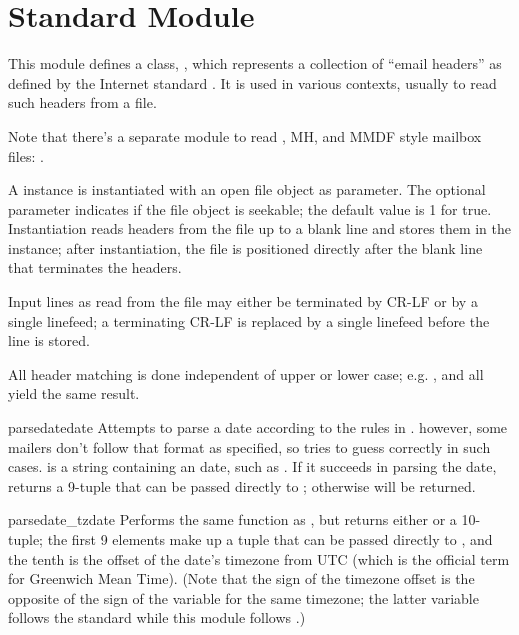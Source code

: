 \section{Standard Module }
\label{module-rfc822}


This module defines a class, , which represents a
collection of ``email headers'' as defined by the Internet standard
.  It is used in various contexts, usually to read such
headers from a file.

Note that there's a separate module to read \UNIX{}, MH, and MMDF
style mailbox files: .

A  instance is instantiated with an open file object as
parameter.  The optional  parameter indicates if the
file object is seekable; the default value is 1 for true.
Instantiation reads headers from the file up to a blank line and
stores them in the instance; after instantiation, the file is
positioned directly after the blank line that terminates the headers.

Input lines as read from the file may either be terminated by CR-LF or
by a single linefeed; a terminating CR-LF is replaced by a single
linefeed before the line is stored.

All header matching is done independent of upper or lower case;
e.g. ,  and  all yield
the same result.

\begin{funcdesc}{parsedate}{date}
Attempts to parse a date according to the rules in .  however,
some mailers don't follow that format as specified, so
 tries to guess correctly in such cases. 
 is a string containing an  date, such as 
.  If it succeeds in parsing
the date,  returns a 9-tuple that can be passed
directly to ; otherwise  will be
returned.  
\end{funcdesc}

\begin{funcdesc}{parsedate_tz}{date}
Performs the same function as , but returns either
 or a 10-tuple; the first 9 elements make up a tuple that
can be passed directly to , and the tenth is the
offset of the date's timezone from UTC (which is the official term
for Greenwich Mean Time).  (Note that the sign of the timezone offset
is the opposite of the sign of the  variable for
the same timezone; the latter variable follows the \POSIX{} standard
while this module follows .)
\end{funcdesc}


